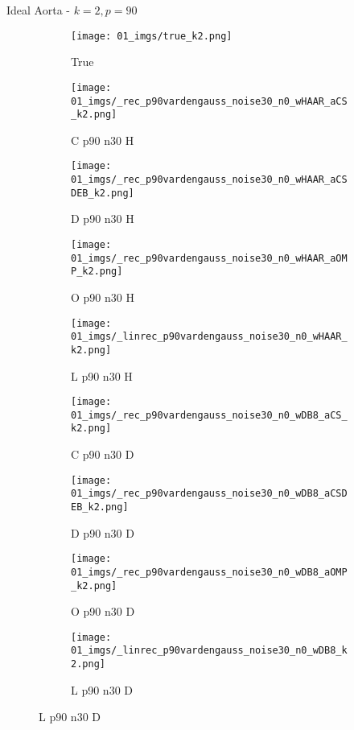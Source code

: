 \begin{frame}{Ideal Aorta - $k=2,p=90$}{}
\begin{figure}
\begin{subfigure}{0.1\textwidth}
\texttt{[image: 01\_imgs/true\_k2.png]}
\caption*{\Tiny True}
\end{subfigure}
\begin{subfigure}{0.1\textwidth}
\texttt{[image: 01\_imgs/\_rec\_p90vardengauss\_noise30\_n0\_wHAAR\_aCS\_k2.png]}
\caption*{\Tiny C p90 n30 H}
\end{subfigure}
\begin{subfigure}{0.1\textwidth}
\texttt{[image: 01\_imgs/\_rec\_p90vardengauss\_noise30\_n0\_wHAAR\_aCSDEB\_k2.png]}
\caption*{\Tiny D p90 n30 H}
\end{subfigure}
\begin{subfigure}{0.1\textwidth}
\texttt{[image: 01\_imgs/\_rec\_p90vardengauss\_noise30\_n0\_wHAAR\_aOMP\_k2.png]}
\caption*{\Tiny O p90 n30 H}
\end{subfigure}
\begin{subfigure}{0.1\textwidth}
\texttt{[image: 01\_imgs/\_linrec\_p90vardengauss\_noise30\_n0\_wHAAR\_k2.png]}
\caption*{\Tiny L p90 n30 H}
\end{subfigure}
\begin{subfigure}{0.1\textwidth}
\texttt{[image: 01\_imgs/\_rec\_p90vardengauss\_noise30\_n0\_wDB8\_aCS\_k2.png]}
\caption*{\Tiny C p90 n30 D}
\end{subfigure}
\begin{subfigure}{0.1\textwidth}
\texttt{[image: 01\_imgs/\_rec\_p90vardengauss\_noise30\_n0\_wDB8\_aCSDEB\_k2.png]}
\caption*{\Tiny D p90 n30 D}
\end{subfigure}
\begin{subfigure}{0.1\textwidth}
\texttt{[image: 01\_imgs/\_rec\_p90vardengauss\_noise30\_n0\_wDB8\_aOMP\_k2.png]}
\caption*{\Tiny O p90 n30 D}
\end{subfigure}
\begin{subfigure}{0.1\textwidth}
\texttt{[image: 01\_imgs/\_linrec\_p90vardengauss\_noise30\_n0\_wDB8\_k2.png]}
\caption*{\Tiny L p90 n30 D}
\end{subfigure}
\end{figure}
\end{frame}

